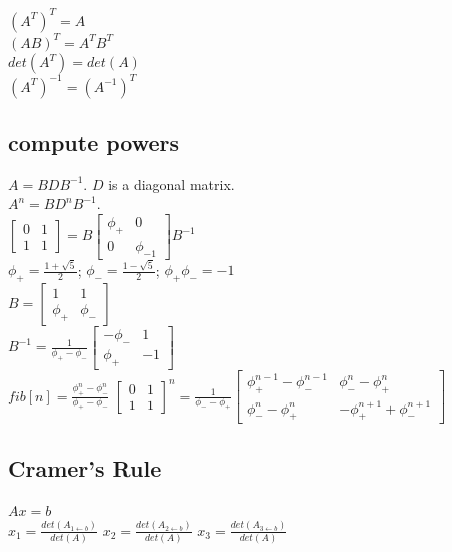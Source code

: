 \begin{multicols}{3}
$(A^T)^T = A$\\
$(AB)^T = A^TB^T$\\
$det(A^T) = det(A)$\\
$(A^T)^{-1} = (A^{-1})^T$

\subsection{compute powers}
$A = BDB^{-1}$. $D$ is a diagonal matrix.\\
$A^{n} = BD^{n}B^{-1}$.\\
$\begin{bmatrix}0& 1\\ 1& 1\end{bmatrix} = B \begin{bmatrix}\phi_{+}& 0\\ 0& \phi_{-1}\end{bmatrix}B^{-1}$\\
$\phi_{+} = \frac{1 + \sqrt{5}}{2}$; $\phi_{-} = \frac{1 - \sqrt{5}}{2}$; $\phi_{+}\phi_{-} = -1$\\
$B = \begin{bmatrix}1& 1\\ \phi_{+}& \phi_{-}\end{bmatrix}$\\
$B^{-1} = \frac{1}{\phi_{+} - \phi_{-}} \begin{bmatrix}-\phi_{-}& 1\\ \phi_{+}& -1\end{bmatrix}$\\
$fib[n] = \frac{\phi_{+}^{n} - \phi_{-}^{n}}{\phi_{+} - \phi_{-}}$
$\begin{bmatrix}0& 1\\ 1& 1\end{bmatrix}^{n} = \frac{1}{\phi_{-} - \phi_{+}}\begin{bmatrix}\phi_{+}^{n-1} - \phi_{-}^{n-1}& \phi_{-}^{n} - \phi_{+}^{n}\\ \phi_{-}^{n} - \phi_{+}^{n}& -\phi_{+}^{n+1} + \phi_{-}^{n+1}\end{bmatrix}$

\subsection{Cramer’s Rule}
$Ax = b$\\
$x_{1} = \frac{det(A_{1 \leftarrow b})}{det(A)}$
$x_{2} = \frac{det(A_{2 \leftarrow b})}{det(A)}$
$x_{3} = \frac{det(A_{3 \leftarrow b})}{det(A)}$


\end{multicols}
